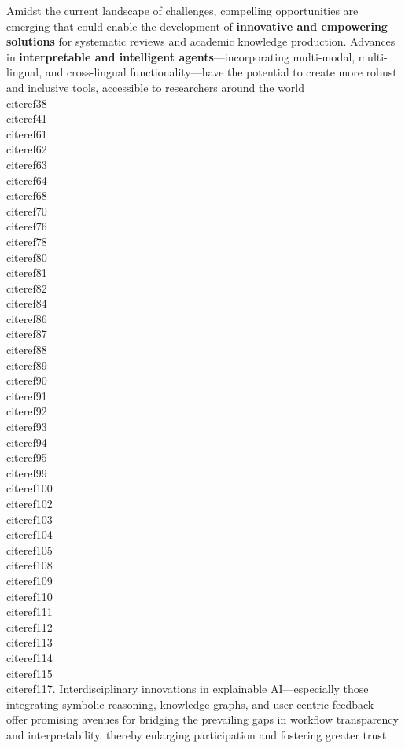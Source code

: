 \documentclass[11pt]{article}
\begin{document}
Amidst the current landscape of challenges, compelling opportunities are emerging that could enable the development of \textbf{innovative and empowering solutions} for systematic reviews and academic knowledge production. Advances in \textbf{interpretable and intelligent agents}—incorporating multi-modal, multi-lingual, and cross-lingual functionality—have the potential to create more robust and inclusive tools, accessible to researchers around the world \\cite{ref38}\\cite{ref41}\\cite{ref61}\\cite{ref62}\\cite{ref63}\\cite{ref64}\\cite{ref68}\\cite{ref70}\\cite{ref76}\\cite{ref78}\\cite{ref80}\\cite{ref81}\\cite{ref82}\\cite{ref84}\\cite{ref86}\\cite{ref87}\\cite{ref88}\\cite{ref89}\\cite{ref90}\\cite{ref91}\\cite{ref92}\\cite{ref93}\\cite{ref94}\\cite{ref95}\\cite{ref99}\\cite{ref100}\\cite{ref102}\\cite{ref103}\\cite{ref104}\\cite{ref105}\\cite{ref108}\\cite{ref109}\\cite{ref110}\\cite{ref111}\\cite{ref112}\\cite{ref113}\\cite{ref114}\\cite{ref115}\\cite{ref117}. Interdisciplinary innovations in explainable AI—especially those integrating symbolic reasoning, knowledge graphs, and user-centric feedback—offer promising avenues for bridging the prevailing gaps in workflow transparency and interpretability, thereby enlarging participation and fostering greater trust 
\end{document}
